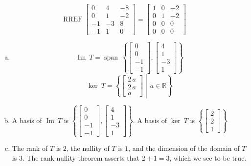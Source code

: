 \begin{exerciseAnswer} 


\[\operatorname{RREF} \left[\begin{array}{ccc}
0 & 4 & -8 \\
0 & 1 & -2 \\
-1 & -3 & 8 \\
-1 & 1 & 0
\end{array}\right] = \left[\begin{array}{ccc}
1 & 0 & -2 \\
0 & 1 & -2 \\
0 & 0 & 0 \\
0 & 0 & 0
\end{array}\right] \]


\begin{enumerate}[(a)]
\item \[\operatorname{Im}\ T = \operatorname{span}\  \left\{ \left[\begin{array}{c}
0 \\
0 \\
-1 \\
-1
\end{array}\right] , \left[\begin{array}{c}
4 \\
1 \\
-3 \\
1
\end{array}\right] \right\} \]\[\operatorname{ker}\ T =  \left\{ \left[\begin{array}{c}
2 \, a \\
2 \, a \\
a
\end{array}\right] \middle|\,a\in\mathbb{R}\right\} \]
\item  A basis of \(\operatorname{Im}\ T\) is \( \left\{ \left[\begin{array}{c}
0 \\
0 \\
-1 \\
-1
\end{array}\right] , \left[\begin{array}{c}
4 \\
1 \\
-3 \\
1
\end{array}\right] \right\} \). A basis of \(\operatorname{ker}\ T\) is \( \left\{ \left[\begin{array}{c}
2 \\
2 \\
1
\end{array}\right] \right\} \)
\item  The rank of \(T\) is \( 2 \), the nullity of \(T\) is \( 1 \), and the dimension of the domain of \(T\) is \( 3 \). The rank-nullity theorem asserts that \( 2 + 1 = 3 \), which we see to be true. 
\end{enumerate}
    
\end{exerciseAnswer}
    
